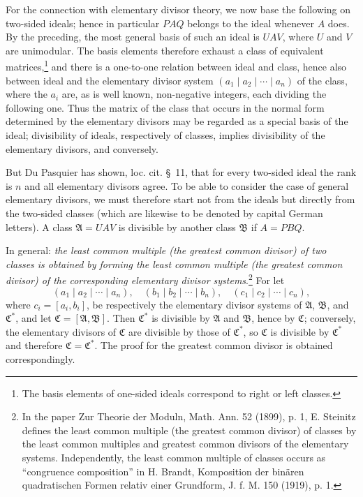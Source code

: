 \documentclass[11pt]{article}
\begin{document}
For the connection with elementary divisor theory, we now base the following on two-sided ideals; hence in particular $PAQ$ belongs to the ideal whenever $A$ does. By the preceding, the most general basis of such an ideal is $UAV$, where $U$ and $V$ are unimodular. The basis elements therefore exhaust a class of equivalent matrices,\footnote{The basis elements of one-sided ideals correspond to right or left classes.} and there is a one-to-one relation between ideal and class, hence also between ideal and the elementary divisor system $(a_1\mid a_2\mid\cdots\mid a_n)$ of the class, where the $a_i$ are, as is well known, non-negative integers, each dividing the following one. Thus the matrix of the class that occurs in the normal form determined by the elementary divisors may be regarded as a special basis of the ideal; divisibility of ideals, respectively of classes, implies divisibility of the elementary divisors, and conversely.

But Du Pasquier has shown, loc. cit. \S~11, that for every two-sided ideal the rank is $n$ and all elementary divisors agree. To be able to consider the case of general elementary divisors, we must therefore start not from the ideals but directly from the two-sided classes (which are likewise to be denoted by capital German letters). A class $\mathfrak A=UAV$ is divisible by another class $\mathfrak B$ if $A=PBQ$.

In general: \emph{the least common multiple (the greatest common divisor) of two classes is obtained by forming the least common multiple (the greatest common divisor) of the corresponding elementary divisor systems}.\footnote{In the paper Zur Theorie der Moduln, Math. Ann. 52 (1899), p. 1, E. Steinitz defines the least common multiple (the greatest common divisor) of classes by the least common multiples and greatest common divisors of the elementary systems. Independently, the least common multiple of classes occurs as ``congruence composition'' in H. Brandt, Komposition der binären quadratischen Formen relativ einer Grundform, J. f. M. 150 (1919), p. 1.} For let
\[
 (a_1\mid a_2\mid\cdots\mid a_n),\quad
 (b_1\mid b_2\mid\cdots\mid b_n),\quad
 (c_1\mid c_2\mid\cdots\mid c_n),
\]
where $c_i=[a_i,b_i]$, be respectively the elementary divisor systems of $\mathfrak A$, $\mathfrak B$, and $\mathfrak C^*$, and let $\mathfrak C=[\mathfrak A,\mathfrak B]$. Then $\mathfrak C^*$ is divisible by $\mathfrak A$ and $\mathfrak B$, hence by $\mathfrak C$; conversely, the elementary divisors of $\mathfrak C$ are divisible by those of $\mathfrak C^*$, so $\mathfrak C$ is divisible by $\mathfrak C^*$ and therefore $\mathfrak C=\mathfrak C^*$. The proof for the greatest common divisor is obtained correspondingly.
\end{document}
